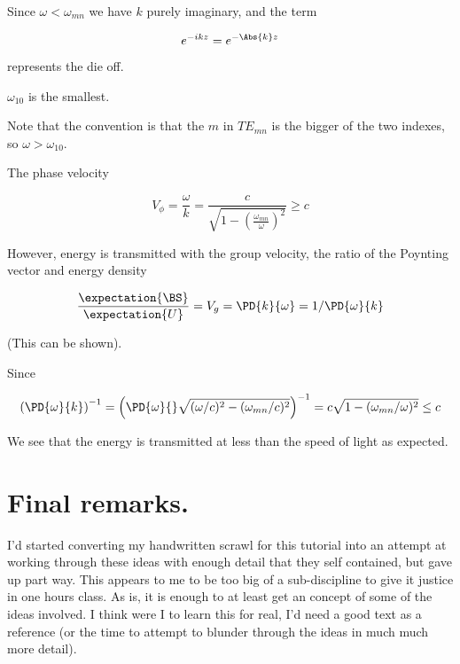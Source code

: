 Since $\omega < \omega_{m n}$ we have $k$ purely imaginary, and the term

\begin{equation}\label{eqn:relativisticElectrodynamicsT4:520}
e^{-i k z} = e^{- \Abs{k} z}
\end{equation}

represents the die off.

$\omega_{10}$ is the smallest.

Note that the convention is that the $m$ in $TE_{m n}$ is the bigger of the two indexes, so $\omega > \omega_{10}$.

The phase velocity 

\begin{equation}\label{eqn:relativisticElectrodynamicsT4:530}
V_\phi = \frac{\omega}{k} = \frac{c}{\sqrt{ 1 - \left(\frac{\omega_{m n}}{\omega}\right)^2 }} \ge c
\end{equation}

However, energy is transmitted with the group velocity, the ratio of the Poynting vector and energy density

\begin{equation}\label{eqn:relativisticElectrodynamicsT4:540}
\frac{\expectation{\BS}}{\expectation{U}} = V_g = \PD{k}{\omega} = 1/\PD{\omega}{k}
\end{equation}

(This can be shown).

Since

\begin{equation}\label{eqn:relativisticElectrodynamicsT4:560}
\left(\PD{\omega}{k}\right)^{-1} = 
\left(
\PD{\omega}{}
\sqrt{ (\omega/c)^2 - (\omega_{m n}/c)^2 }
\right)^{-1} = c \sqrt{ 1 - (\omega_{m n}/\omega)^2 } \le c
\end{equation}

We see that the energy is transmitted at less than the speed of light as expected.

\section{Final remarks.}

I'd started converting my handwritten scrawl for this tutorial into an attempt at working through these ideas with enough detail that they self contained, but gave up part way.  This appears to me to be too big of a sub-discipline to give it justice in one hours class.  As is, it is enough to at least get an concept of some of the ideas involved.  I think were I to learn this for real, I'd need a good text as a reference (or the time to attempt to blunder through the ideas in much much more detail).

\EndNoBibArticle
